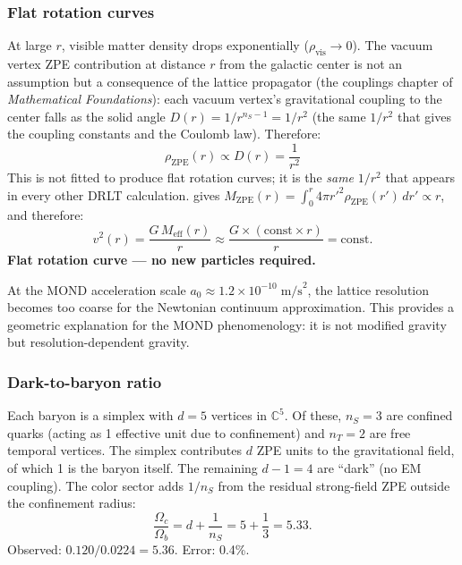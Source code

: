 \documentclass[12pt]{article}
\theoremstyle{remark}
\theoremstyle{definition}
\newcommand{\CC}{\mathbb{C}}
\begin{document}
\subsubsection{Flat rotation curves}

At large $r$, visible matter density drops exponentially ($\rho_\text{vis} \to 0$). The vacuum vertex ZPE contribution at distance $r$ from the galactic center is not an assumption but a consequence of the lattice propagator (the couplings chapter of \textit{Mathematical Foundations}): each vacuum vertex's gravitational coupling to the center falls as the solid angle $D(r) = 1/r^{n_S - 1} = 1/r^2$ (the same $1/r^2$ that gives the coupling constants and the Coulomb law). Therefore:
\begin{equation}
\rho_\text{ZPE}(r) \propto D(r) = \frac{1}{r^2}
\end{equation}
This is not fitted to produce flat rotation curves; it is the \emph{same} $1/r^2$ that appears in every other DRLT calculation.
gives $M_\text{ZPE}(r) = \int_0^r 4\pi r'^2 \rho_\text{ZPE}(r')\,dr' \propto r$, and therefore:
\begin{equation}
v^2(r) = \frac{G\,M_\text{eff}(r)}{r} \approx \frac{G \times (\text{const}\times r)}{r} = \text{const}.
\end{equation}
\textbf{Flat rotation curve --- no new particles required.}

At the MOND acceleration scale $a_0 \approx 1.2 \times 10^{-10}\;\text{m/s}^2$, the lattice resolution becomes too coarse for the Newtonian continuum approximation. This provides a geometric explanation for the MOND phenomenology: it is not modified gravity but resolution-dependent gravity.

\subsubsection{Dark-to-baryon ratio}

Each baryon is a simplex with $d = 5$ vertices in $\CC^5$. Of these, $n_S = 3$ are confined quarks (acting as 1 effective unit due to confinement) and $n_T = 2$ are free temporal vertices. The simplex contributes $d$ ZPE units to the gravitational field, of which 1 is the baryon itself. The remaining $d - 1 = 4$ are ``dark'' (no EM coupling). The color sector adds $1/n_S$ from the residual strong-field ZPE outside the confinement radius:
\begin{equation}
\frac{\Omega_c}{\Omega_b} = d + \frac{1}{n_S} = 5 + \frac{1}{3} = 5.33.
\end{equation}
Observed: $0.120/0.0224 = 5.36$. Error: 0.4\%.
\end{document}

